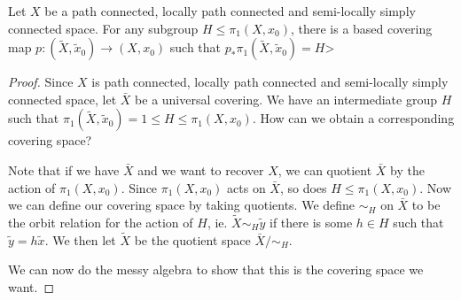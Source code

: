 \documentclass[a4paper]{article}
\begin{document}
\begin{prop}
  Let $X$ be a path connected, locally path connected and semi-locally simply connected space. For any subgroup $H \leq \pi_1(X, x_0)$, there is a based covering map $p: (\tilde{X}, \tilde{x}_0)\to (X, x_0)$ such that $p_* \pi_1(\tilde{X}, \tilde{x}_0) = H$>
\end{prop}

\begin{proof}
  Since $X$ is path connected, locally path connected and semi-locally simply connected space, let $\bar{X}$ be a universal covering. We have an intermediate group $H$ such that $\pi_1(\tilde{X}, \tilde{x}_0) = 1 \leq H \leq \pi_1(X, x_0)$. How can we obtain a corresponding covering space?

  Note that if we have $\bar{X}$ and we want to recover $X$, we can quotient $\bar{X}$ by the action of $\pi_1(X, x_0)$. Since $\pi_1(X, x_0)$ acts on $\bar{X}$, so does $H \leq \pi_1(X, x_0)$. Now we can define our covering space by taking quotients. We define $\sim_H$ on $\bar{X}$ to be the orbit relation for the action of $H$, ie. $\tilde{X} \sim_H \tilde{y}$ if there is some $h \in H$  such that $\tilde{y} = h\tilde{x}$. We then let $\tilde{X}$ be the quotient space $\bar{X}/{\sim_H}$.

  We can now do the messy algebra to show that this is the covering space we want.
\end{proof}
\end{document}
